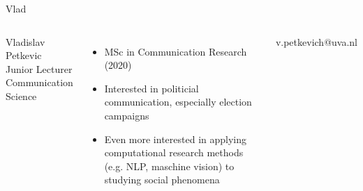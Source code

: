 \begin{frame}{Vlad}
	\begin{columns}
		Vladislav Petkevic \\
		Junior Lecturer Communication Science \\
		\begin{itemize}
			\item MSc in Communication Research (2020)
			\item Interested in politicial communication, especially election campaigns
			\item Even more interested in applying computational research methods (e.g. NLP, maschine vision) to studying social phenomena
		\end{itemize}
		v.petkevich@uva.nl
	\end{columns}
\end{frame}


